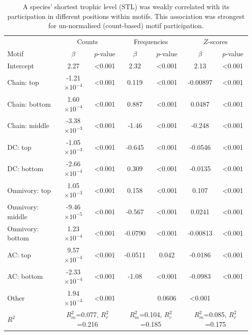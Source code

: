\documentclass[12pt]{article}
\begin{document}
\begin{spacing}{2.0}
			\begin{table}[h!]
    			\caption{A species' shortest trophic level (STL) was weakly correlated with its participation in different positions within motifs. This association was strongest for un-normalised (count-based) motif participation.}
    			\label{tab:positions_vs_STL}
    			\begin{tabular}{l | c c | c c | c c}
    			& \multicolumn{2}{c|}{Counts} & \multicolumn{2}{c|}{Frequencies} & \multicolumn{2}{c}{$Z$-scores} \\
    			Motif & $\beta$ & $p$-value & $\beta$ & $p$-value & $\beta$ & $p$-value \\
    			\hline
                Intercept	&	2.27	&	\textless0.001	&	2.32	&	\textless0.001	&	2.13	&	\textless0.001	\\
                Chain: top	&	-1.21$\times10^{-4}$	&	\textless0.001	&	0.119	&	\textless0.001	&	-0.00897	&	\textless0.001	\\
                Chain: bottom	&	1.60$\times10^{-4}$	&	\textless0.001	&	0.887	&	\textless0.001	&	0.0487	&	\textless0.001	\\
                Chain: middle	&	-3.38$\times10^{-3}$	&	\textless0.001	&	-1.46	&	\textless0.001	&	-0.248	&	\textless0.001	\\
                DC: top	&	-1.05$\times10^{-3}$	&	\textless0.001	&	-0.645	&	\textless0.001	&	-0.0546	&	\textless0.001	\\
                DC: bottom	&	-2.66$\times10^{-4}$	&	\textless0.001	&	0.309	&	\textless0.001	&	-0.0135	&	\textless0.001	\\
                Omnivory: top	&	1.05$\times10^{-3}$	&	\textless0.001	&	0.158	&	\textless0.001	&	0.107	&	\textless0.001	\\
                Omnivory: middle	&	-9.46$\times10^{-5}$ &	\textless0.001	&	-0.567	&	\textless0.001	&	0.0241	&	\textless0.001	\\
                Omnivory: bottom	&	1.23$\times10^{-4}$	&	\textless0.001	&	-0.0790	&	\textless0.001	&	-0.00813	&	\textless0.001	\\
                AC: top	&	9.57$\times10^{-4}$	&	\textless0.001	&	-0.0511	&	0.042	&	-0.0186	&	\textless0.001	\\
                AC: bottom	&	-2.33$\times10^{-4}$	&	\textless0.001	&	-1.08	&	\textless0.001	&	-0.0983	&	\textless0.001	\\
                Other	&	1.94$\times10^{-4}$	&	\textless0.001	&				&	0.0606	&	\textless0.001	\\
    			\hline
    			$R^2$ & \multicolumn{2}{c|}{\tiny{$R^2_m$=0.077, $R^2_c$=0.216}} & 
    			\multicolumn{2}{c|}{\tiny{$R^2_m$=0.104, $R^2_c$=0.185}} & 
    			\multicolumn{2}{c}{\tiny{$R^2_m$=0.085, $R^2_c$=0.175}} \\
    			\end{tabular}
    			\end{table}


\end{spacing}
\end{document}
